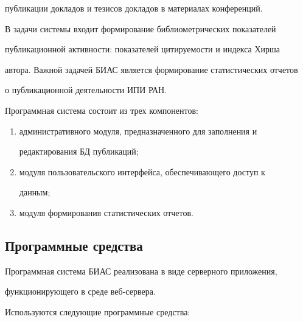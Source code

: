 публикации докладов и тезисов докладов в материалах конференций.





  В задачи системы входит формирование библиометрических показателей


пуб\-ли\-ка\-ци\-он\-ной активности: показателей цитируемости и индекса Хирша


автора. Важной задачей БИАС является формирование статистических отчетов


о публикационной деятельности ИПИ РАН.





  Программная система состоит из трех компонентов:


  \begin{enumerate}[(1)]


\item административного модуля, предназначенного для заполнения и


редактирования БД публикаций;\\[-15pt]


\item модуля пользовательского интерфейса, обеспечивающего доступ к


данным;\\[-15pt]


\item модуля формирования статистических отчетов.


\end{enumerate}








\subsection{Программные средства}











  Программная система БИАС реализована в виде серверного приложения,


функционирующего в среде веб-сер\-вера.





  Используются следующие программные средства:


